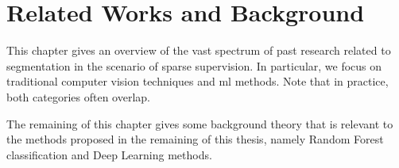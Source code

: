 \chapter{Related Works and Background}
\glsresetall

\renewcommand{\thealgsubstate}{\alph{algsubstate}}
\newenvironment{algsubstates}
  {\setcounter{algsubstate}{0}%
   \renewcommand{\State}{%
     \stepcounter{algsubstate}%
     \Statex {\footnotesize\thealgsubstate:}\space}}
  {}

This chapter gives an overview of the vast spectrum of past research related to segmentation in the scenario of sparse supervision.
In particular, we focus on traditional computer vision techniques and
\gls{ml} methods.
Note that in practice, both categories often overlap.

The remaining of this chapter gives some background theory that is relevant to the methods proposed in the remaining of this thesis, namely Random Forest classification and Deep Learning methods.





